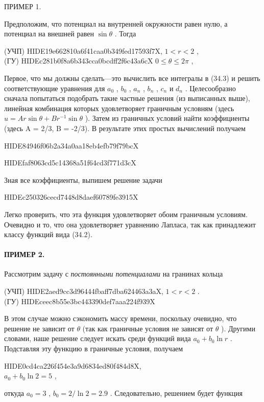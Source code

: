 \documentclass[
  ukrainian,
]{article}
\begin{document}
ПРИМЕР 1.

Предположим, что потенциал на внутренней окружности равен нулю, а
потенциал на внешней равен \(\sin\theta\) . Тогда

(УЧП) HIDE19e662810a6f41caa0b349fed17593f7X, \(1 < r < 2\) ,\\
(ГУ) HIDEc281b0f8a6b343cca0bcdff2f6c43a6cX \(0 \le \theta \le 2\pi\) ,

Первое, что мы должны сделать---это вычислить все интегралы в (34.3) и
решить соответствующие уравнения для \(a_0\) , \(b_0\) , \(a_n\) ,
\(b_n\) , \(c_n\) и \(d_n\) . Целесообразно сначала попытаться подобрать
такие частные решения (из выписанных выше), линейная комбинация которых
удовлетворяет граничным условням (здесь
\(u = Ar \sin \theta + Br^{-1} \sin \theta\) ). Затем из граничных
условий найти коэффициенты (здесь A = 2/3, B = -2/3). В результате этих
простых вычислений получаем

HIDE84946f06b2a34a0aa18eb4efb79f79bcX

HIDEfaf8063cd5c14368a51f64cd3f771d3cX

Зная все коэффициенты, выпишем решение задачи

HIDEc250326cecd7448d8daef60789fe3915X

Легко проверить, что эта функция удовлетворяет обоим граничным условиям.
Очевидно и то, что она удовлетворяет уравнению Лапласа, так как
принадлежит классу функций вида (34.2).

\paragraph{ПРИМЕР 2.}\label{ux43fux440ux438ux43cux435ux440-2.}

Рассмотрим задачу с \emph{постоянными потенциалами} на гранинах кольца

(УЧП) HIDE2aed9cc3d96444fbaff7dba624463a3aX, \(1 < r < 2\) .\\
(ГУ) HIDEceec8b55e3bc443390def7aaa224f939X

В этом случае можно сэкономить массу времени, поскольку очевидно, что
решение не зависит от \(\theta\) (так как граничные условия не зависят
от \(\theta\) ). Другими словами, наше решение следует искать среди
функций вида \(a_0 + b_0 \ln r\) . Подставляя эту функцию в граничные
условия, получаем

HIDE0cd4ca226f454e3a9d6834ed80f484d8X,\\
\(a_0 + b_0 \ln 2 = 5\) ,

откуда \(a_0 = 3\) , \(b_0 = 2/\ln 2 = 2.9\) . Следовательно, решением
будет функция
\end{document}
